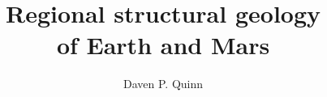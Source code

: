 \documentclass{caltech_thesis}
\title{Regional structural geology\\ of Earth and Mars}
\author{Daven P. Quinn}
\begin{document}
\maketitle

\begin{spacing}{1.4}




\tableofcontents
{}
\listoftables
\listoffigures








\end{spacing}
\end{document}
